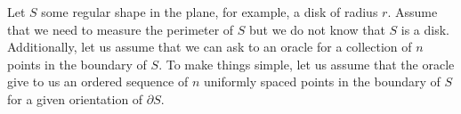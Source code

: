 Let $S$ some regular shape in the plane, for example, a disk of radius $r$. Assume that we need to measure the perimeter of $S$ but we do not know that $S$ is a disk. Additionally, let us assume that we can ask to an oracle for a collection of $n$ points in the boundary of $S$. To make things simple, let us assume that the oracle give to us an ordered sequence of $n$ uniformly spaced points in the boundary of $S$ for a given orientation of $\partial S$. 

\begin{figure}
\center
{}
\end{figure}
